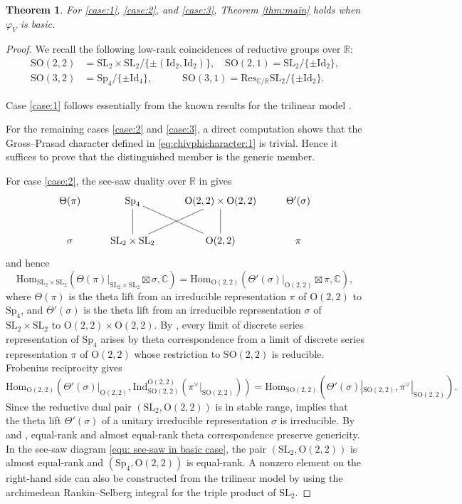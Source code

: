 \documentclass[12pt]{amsart}
\numberwithin{equation}{subsection}
\newcommand{\BC}{{\mathbb {C}}}
\newcommand{\BR}{{\mathbb {R}}}
\newcommand{\RO}{{\mathrm {O}}}
\newcommand{\Hom}{{\mathrm{Hom}}}
\newcommand{\Ind}{{\mathrm{Ind}}}
\newcommand{\Id}{{\mathrm{Id}}}
\newcommand{\Res}{{\mathrm{Res}}}
\newcommand{\SL}{{\mathrm{SL}}}
\newcommand{\SO}{{\mathrm{SO}}}
\newcommand{\Sp}{{\mathrm{Sp}}}
\def\SO{\mathrm{SO}}
\newtheorem{thm}{Theorem}[subsection]
\begin{document}
\begin{thm}
For \eqref{case:1}, \eqref{case:2}, and \eqref{case:3}, Theorem \ref{thm:main} holds when $\varphi_V$ is basic.
\end{thm}
\begin{proof}
We recall the following low-rank coincidences of reductive groups over $\BR$:
\[
\begin{aligned}
\SO(2,2)&=\SL_2\times \SL_2/\{\pm (\Id_2,\Id_2)\},\quad
\SO(2,1)=\SL_2/\{\pm\Id_2\},\\
\SO(3,2)&=\Sp_4/\{\pm \Id_4\},\qquad\quad
\SO(3,1)=\Res_{\BC/\BR}\SL_2/\{\pm \Id_2\}.
\end{aligned}
\]

Case \eqref{case:1} follows essentially from the known results for the
trilinear model \cite[\S 9]{Prasad1990Trilinear}.


For the remaining cases \eqref{case:2} and \eqref{case:3}, a direct computation shows that the Gross--Prasad character defined in \eqref{eq:chivphicharacter:1} is trivial. Hence it suffices to prove that the distinguished member is the generic member.

For case \eqref{case:2}, the see-saw duality over $\BR$ in
\cite[p.~69]{harris1992arithmetic} gives
\begin{equation}\label{equ: see-saw in basic case}
\xymatrix{
\Theta(\pi) & \Sp_4  \ar@{-}[d]\ar@{-}[rd]&\RO(2,2)\times \RO(2,2)\ar@{-}[d]\ar@{-}[ld]&\Theta'(\sigma)\\
\sigma&\mathrm{SL}_2\times \SL_2&\mathrm{O}(2,2)&\pi
}
\end{equation}
and hence
\[
\Hom_{\SL_2\times \SL_2}(\Theta(\pi)|_{\SL_2\times \SL_2}\boxtimes\sigma,\BC)=\Hom_{\RO(2,2)}(\Theta'(\sigma)|_{\RO(2,2)}\boxtimes \pi,\BC),
\]
where $\Theta(\pi)$ is the theta lift from an irreducible representation
$\pi$ of $\RO(2,2)$ to $\Sp_4$, and $\Theta'(\sigma)$ is the theta lift from
an irreducible representation $\sigma$ of $\SL_2\times \SL_2$ to
$\RO(2,2)\times \RO(2,2)$. By \cite[Thm.~15]{paul2005howe}, every limit of
discrete series representation of $\Sp_4$ arises by theta correspondence from
a limit of discrete series representation $\pi$ of $\RO(2,2)$ whose
restriction to $\SO(2,2)$ is reducible. Frobenius reciprocity gives
\begin{equation}\label{equ: second equation}
\Hom_{\RO(2,2)}(\Theta'(\sigma)|_{\RO(2,2)},\Ind_{\SO(2,2)}^{\RO(2,2)}(\pi^{\vee}|_{\SO(2,2)}))=\Hom_{\SO(2,2)}(\Theta'(\sigma)|_{\SO(2,2)},\pi^{\vee}|_{\SO(2,2)}).
\end{equation}
Since the reductive dual pair $(\SL_2,\RO(2,2))$ is in stable range,
\cite{Loke_Ma_2015} implies that the theta lift $\Theta'(\sigma)$ of a
unitary irreducible representation $\sigma$ is irreducible. By
\cite[Thm.~18]{paul2005howe} and \cite[Thm.~6.2]{vogandim}, equal-rank and
almost equal-rank theta correspondence preserve genericity. In the see-saw
diagram \eqref{equ: see-saw in basic case}, the pair $(\SL_2,\RO(2,2))$ is
almost equal-rank and $(\Sp_4,\RO(2,2))$ is equal-rank. A nonzero element on
the right-hand side can also be constructed from the trilinear model by using
the archimedean Rankin--Selberg integral for the triple product of $\SL_2$.


\end{proof}
\end{document}
